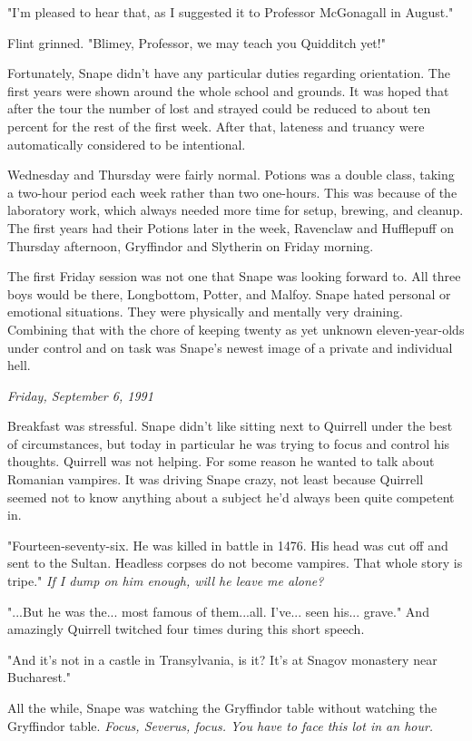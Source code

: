 \documentclass[a4paper,11pt]{article}
\begin{document}
"I'm pleased to hear that, as I suggested it to Professor McGonagall in August."

Flint grinned. "Blimey, Professor, we may teach you Quidditch yet!"

Fortunately, Snape didn't have any particular duties regarding orientation. The first years were shown around the whole school and grounds. It was hoped that after the tour the number of lost and strayed could be reduced to about ten percent for the rest of the first week. After that, lateness and truancy were automatically considered to be intentional.

Wednesday and Thursday were fairly normal. Potions was a double class, taking a two-hour period each week rather than two one-hours. This was because of the laboratory work, which always needed more time for setup, brewing, and cleanup. The first years had their Potions later in the week, Ravenclaw and Hufflepuff on Thursday afternoon, Gryffindor and Slytherin on Friday morning.

The first Friday session was not one that Snape was looking forward to. All three boys would be there, Longbottom, Potter, and Malfoy. Snape hated personal or emotional situations. They were physically and mentally very draining. Combining that with the chore of keeping twenty as yet unknown eleven-year-olds under control and on task was Snape's newest image of a private and individual hell.

\emph{Friday, September 6, 1991}

Breakfast was stressful. Snape didn't like sitting next to Quirrell under the best of circumstances, but today in particular he was trying to focus and control his thoughts. Quirrell was not helping. For some reason he wanted to talk about Romanian vampires. It was driving Snape crazy, not least because Quirrell seemed not to know anything about a subject he'd always been quite competent in.

"Fourteen-seventy-six. He was killed in battle in 1476. His head was cut off and sent to the Sultan. Headless corpses do not become vampires. That whole story is tripe." \emph{If I dump on him enough, will he leave me alone?}

"...But he was the... most famous of them...all. I've... seen his... grave." And amazingly Quirrell twitched four times during this short speech.

"And it's not in a castle in Transylvania, is it? It's at Snagov monastery near Bucharest."

All the while, Snape was watching the Gryffindor table without watching the Gryffindor table. \emph{Focus, Severus, focus. You have to face this lot in an hour.}
\end{document}
